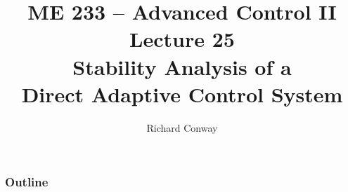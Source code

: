 \documentclass[handout,mathserif]{beamer}       %
\title{ME 233 -- Advanced Control II\\
    Lecture 25 \\
    Stability Analysis of a \\
    Direct Adaptive Control System}
\author{Richard Conway}
\institute{UC Berkeley}
\begin{document}
\maketitle

\begin{frame}
    \frametitle{Outline}
    \tableofcontents
\end{frame}









\end{document}
